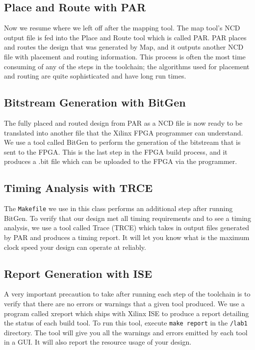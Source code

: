 \documentclass[11pt]{article}
\begin{document}
\subsection{Place and Route with PAR}
Now we resume where we left off after the mapping tool. The map tool's NCD output file is fed into the Place and Route tool which is called PAR. PAR places and routes the design that was generated by Map, and it outputs another NCD file with placement and routing information. This process is often the most time consuming of any of the steps in the toolchain; the algorithms used for placement and routing are quite sophisticated and have long run times.

\subsection{Bitstream Generation with BitGen}
The fully placed and routed design from PAR as a NCD file is now ready to be translated into another file that the Xilinx FPGA programmer can understand. We use a tool called BitGen to perform the generation of the bitstream that is sent to the FPGA. This is the last step in the FPGA build process, and it produces a .bit file which can be uploaded to the FPGA via the programmer.

\subsection{Timing Analysis with TRCE}
The \verb|Makefile| we use in this class performs an additional step after running BitGen. To verify that our design met all timing requirements and to see a timing analysis, we use a tool called Trace (TRCE) which takes in output files generated by PAR and produces a timing report. It will let you know what is the maximum clock speed your design can operate at reliably.

\subsection{Report Generation with ISE}
A very important precaution to take after running each step of the toolchain is to verify that there are no errors or warnings that a given tool produced. We use a program called xreport which ships with Xilinx ISE to produce a report detailing the status of each build tool. To run this tool, execute \verb|make report| in the \verb|/lab1| directory. The tool will give you all the warnings and errors emitted by each tool in a GUI. It will also report the resource usage of your design.
\end{document}
